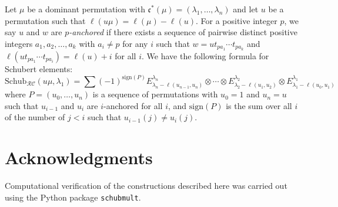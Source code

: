 \documentclass{amsart}
\theoremstyle{definition}
\theoremstyle{remark}
\numberwithin{equation}{section}
\newcommand{\RC}{\mathcal{RC}}
\newcommand{\code}{\mathfrak{c}}
\begin{document}
Let $\mu$ be a dominant permutation with $\code^*(\mu) = (\lambda_1,\ldots,\lambda_n)$ and let $u$ be a permutation such that $\ell(u\mu) = \ell(\mu) - \ell(u)$. For a positive integer $p$, we say $u$ and $w$ are \emph{$p$-anchored} if there exists a sequence of pairwise distinct positive integers $a_1,a_2,\ldots,a_k$ with $a_i\neq p$ for any $i$ such that $w=ut_{pa_1}\cdots t_{pa_k}$ and $\ell(ut_{pa_1}\cdots t_{pa_i})=\ell(u)+i$ for all $i$. We have the following formula for Schubert elements:
$$\mathrm{Schub}_{\RC}(u\mu, \lambda_1) = \sum (-1)^{\mathrm{sign}(P)}E_{\lambda_n-\ell(u_{n-1},u_n)}^{\lambda_n}\otimes \cdots \otimes E_{\lambda_2-\ell(u_1,u_2)}^{\lambda_2}\otimes E_{\lambda_1-\ell(u_0,u_1)}^{\lambda_1}$$
where $P=(u_0,\ldots,u_n)$ is a sequence of permutations with $u_0=1$ and $u_n=u$ such that $u_{i-1}$ and $u_i$ are $i$-anchored for all $i$, and $\mathrm{sign}(P)$ is the sum over all $i$ of the number of $j<i$ such that $u_{i-1}(j)\neq u_i(j)$.

\section*{Acknowledgments}

Computational verification of the constructions described here was carried out using the Python package \texttt{schubmult}.

\cite{samuelmolev}


\end{document}
